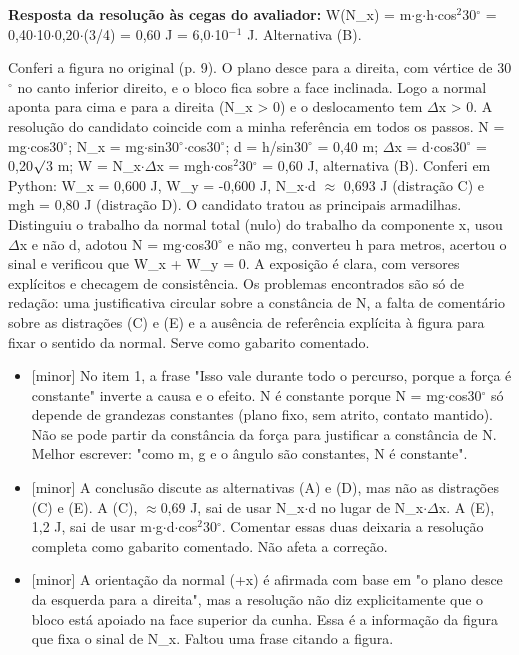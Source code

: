 \documentclass{article}%
\begin{document}
\textbf{Resposta da resolução às cegas do avaliador:} W(N\_x) = m$\cdot$g$\cdot$h$\cdot$cos$^2$30$^\circ$ = 0,40$\cdot$10$\cdot$0,20$\cdot$(3/4) = 0,60 J = 6,0$\cdot$10$^{-}$$^{1}$ J. Alternativa (B).\par %
Conferi a figura no original (p. 9). O plano desce para a direita, com vértice de 30$^\circ$ no canto inferior direito, e o bloco fica sobre a face inclinada. Logo a normal aponta para cima e para a direita (N\_x > 0) e o deslocamento tem $\Delta$x > 0. A resolução do candidato coincide com a minha referência em todos os passos. N = mg$\cdot$cos30$^\circ$; N\_x = mg$\cdot$sin30$^\circ$$\cdot$cos30$^\circ$; d = h/sin30$^\circ$ = 0,40 m; $\Delta$x = d$\cdot$cos30$^\circ$ = 0,20$\surd$3 m; W = N\_x$\cdot$$\Delta$x = mgh$\cdot$cos$^2$30$^\circ$ = 0,60 J, alternativa (B). Conferi em Python: W\_x = 0,600 J, W\_y = -0,600 J, N\_x$\cdot$d $\approx$ 0,693 J (distração C) e mgh = 0,80 J (distração D). O candidato tratou as principais armadilhas. Distinguiu o trabalho da normal total (nulo) do trabalho da componente x, usou $\Delta$x e não d, adotou N = mg$\cdot$cos30$^\circ$ e não mg, converteu h para metros, acertou o sinal e verificou que W\_x + W\_y = 0. A exposição é clara, com versores explícitos e checagem de consistência. Os problemas encontrados são só de redação: uma justificativa circular sobre a constância de N, a falta de comentário sobre as distrações (C) e (E) e a ausência de referência explícita à figura para fixar o sentido da normal. Serve como gabarito comentado.%
\begin{itemize}%
\item%
{[}minor{]} No item 1, a frase "Isso vale durante todo o percurso, porque a força é constante" inverte a causa e o efeito. N é constante porque N = mg$\cdot$cos30$^\circ$ só depende de grandezas constantes (plano fixo, sem atrito, contato mantido). Não se pode partir da constância da força para justificar a constância de N. Melhor escrever: "como m, g e o ângulo são constantes, N é constante".%
\item%
{[}minor{]} A conclusão discute as alternativas (A) e (D), mas não as distrações (C) e (E). A (C), $\approx$0,69 J, sai de usar N\_x$\cdot$d no lugar de N\_x$\cdot$$\Delta$x. A (E), 1,2 J, sai de usar m$\cdot$g$\cdot$d$\cdot$cos$^2$30$^\circ$. Comentar essas duas deixaria a resolução completa como gabarito comentado. Não afeta a correção.%
\item%
{[}minor{]} A orientação da normal (+x) é afirmada com base em "o plano desce da esquerda para a direita", mas a resolução não diz explicitamente que o bloco está apoiado na face superior da cunha. Essa é a informação da figura que fixa o sinal de N\_x. Faltou uma frase citando a figura.%
\end{itemize}%
\end{document}
